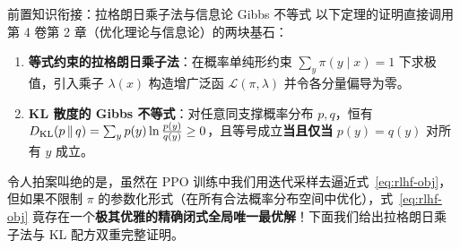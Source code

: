 \begin{recallBox}{前置知识衔接：拉格朗日乘子法与信息论 Gibbs 不等式}
以下定理的证明直接调用第 4 卷第 2 章（优化理论与信息论）的两块基石：
\begin{enumerate}
  \item \textbf{等式约束的拉格朗日乘子法}：在概率单纯形约束 $\sum_y \pi(y \mid x) = 1$ 下求极值，引入乘子 $\lambda(x)$ 构造增广泛函 $\mathcal{L}(\pi, \lambda)$ 并令各分量偏导为零。
  \item \textbf{KL 散度的 Gibbs 不等式}：对任意同支撑概率分布 $p, q$，恒有 $D_{\mathrm{KL}}(p \,\|\, q) = \sum_y p(y)\ln\frac{p(y)}{q(y)} \ge 0$，且等号成立\textbf{当且仅当} $p(y) = q(y)$ 对所有 $y$ 成立。
\end{enumerate}
\end{recallBox}

令人拍案叫绝的是，虽然在 PPO 训练中我们用迭代采样去逼近式~\eqref{eq:rlhf-obj}，但如果不限制 $\pi$ 的参数化形式（在所有合法概率分布空间中优化），式~\eqref{eq:rlhf-obj} 竟存在一个\textbf{极其优雅的精确闭式全局唯一最优解}！下面我们给出拉格朗日乘子法与 KL 配方双重完整证明。

